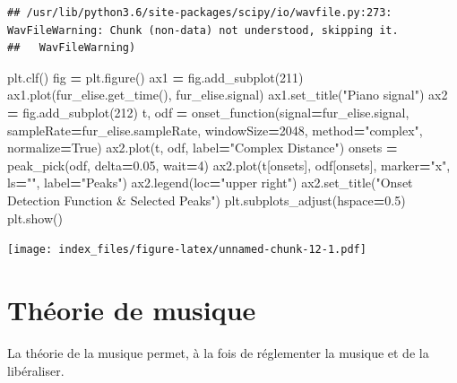 \documentclass[french,]{article}
\newenvironment{Shaded}{\begin{snugshade}}{\end{snugshade}}
\newcommand{\DecValTok}[1]{\textcolor[rgb]{0.00,0.00,0.81}{#1}}
\newcommand{\FloatTok}[1]{\textcolor[rgb]{0.00,0.00,0.81}{#1}}
\newcommand{\NormalTok}[1]{#1}
\newcommand{\OperatorTok}[1]{\textcolor[rgb]{0.81,0.36,0.00}{\textbf{#1}}}
\newcommand{\StringTok}[1]{\textcolor[rgb]{0.31,0.60,0.02}{#1}}
\newcommand{\VariableTok}[1]{\textcolor[rgb]{0.00,0.00,0.00}{#1}}
\begin{document}
\begin{verbatim}
## /usr/lib/python3.6/site-packages/scipy/io/wavfile.py:273: WavFileWarning: Chunk (non-data) not understood, skipping it.
##   WavFileWarning)
\end{verbatim}

\begin{Shaded}
\begin{Highlighting}[]
\NormalTok{plt.clf()}
\NormalTok{fig }\OperatorTok{=}\NormalTok{ plt.figure()}
\NormalTok{ax1 }\OperatorTok{=}\NormalTok{ fig.add_subplot(}\DecValTok{211}\NormalTok{)}
\NormalTok{ax1.plot(fur_elise.get_time(), fur_elise.signal)}
\NormalTok{ax1.set_title(}\StringTok{"Piano signal"}\NormalTok{)}
\NormalTok{ax2 }\OperatorTok{=}\NormalTok{ fig.add_subplot(}\DecValTok{212}\NormalTok{)}
\NormalTok{t, odf }\OperatorTok{=}\NormalTok{ onset_function(signal}\OperatorTok{=}\NormalTok{fur_elise.signal, sampleRate}\OperatorTok{=}\NormalTok{fur_elise.sampleRate,}
\NormalTok{                                windowSize}\OperatorTok{=}\DecValTok{2048}\NormalTok{, method}\OperatorTok{=}\StringTok{"complex"}\NormalTok{, normalize}\OperatorTok{=}\VariableTok{True}\NormalTok{)}
\NormalTok{ax2.plot(t, odf, label}\OperatorTok{=}\StringTok{"Complex Distance"}\NormalTok{)}
\NormalTok{onsets }\OperatorTok{=}\NormalTok{ peak_pick(odf, delta}\OperatorTok{=}\FloatTok{0.05}\NormalTok{, wait}\OperatorTok{=}\DecValTok{4}\NormalTok{)}
\NormalTok{ax2.plot(t[onsets], odf[onsets], marker}\OperatorTok{=}\StringTok{"x"}\NormalTok{, ls}\OperatorTok{=}\StringTok{""}\NormalTok{, label}\OperatorTok{=}\StringTok{"Peaks"}\NormalTok{)}
\NormalTok{ax2.legend(loc}\OperatorTok{=}\StringTok{"upper right"}\NormalTok{)}
\NormalTok{ax2.set_title(}\StringTok{"Onset Detection Function & Selected Peaks"}\NormalTok{)}
\NormalTok{plt.subplots_adjust(hspace}\OperatorTok{=}\FloatTok{0.5}\NormalTok{)}
\NormalTok{plt.show()}
\end{Highlighting}
\end{Shaded}

\texttt{[image: index\_files/figure-latex/unnamed-chunk-12-1.pdf]}

\pagebreak

\hypertarget{theorie-de-musique}{%
\section{Théorie de musique}\label{theorie-de-musique}}

La théorie de la musique permet, à la fois de réglementer la musique et
de la libéraliser.
\end{document}
